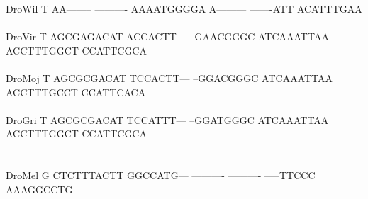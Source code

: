 \documentclass[11pt,twoside,reqno,a4paper]{article}
\begin{document}
{DroWil	T	AA--------	----------	AAAATGGGGA	A---------	-------ATT	ACATTTGAA\\
\hspace*{7\charwidth}\hspace*{1\charwidth}\hspace*{1\charwidth}\hspace*{1\charwidth}\hspace*{1\charwidth}\hspace*{1\charwidth}\hspace*{1\charwidth}\\
DroVir	T	AGCGAGACAT	ACCACTT---	--GAACGGGC	ATCAAATTAA	ACCTTTGGCT	CCATTCGCA\\
\hspace*{7\charwidth}\hspace*{1\charwidth}\hspace*{1\charwidth}\hspace*{1\charwidth}\hspace*{1\charwidth}\hspace*{1\charwidth}\hspace*{1\charwidth}\\
DroMoj	T	AGCGCGACAT	TCCACTT---	--GGACGGGC	ATCAAATTAA	ACCTTTGCCT	CCATTCACA\\
\hspace*{7\charwidth}\hspace*{1\charwidth}\hspace*{1\charwidth}\hspace*{1\charwidth}\hspace*{1\charwidth}\hspace*{1\charwidth}\hspace*{1\charwidth}\\
DroGri	T	AGCGCGACAT	TCCATTT---	--GGATGGGC	ATCAAATTAA	ACCTTTGGCT	CCATTCGCA\\
\hspace*{7\charwidth}\hspace*{1\charwidth}\hspace*{1\charwidth}\hspace*{1\charwidth}\hspace*{1\charwidth}\hspace*{1\charwidth}\hspace*{1\charwidth}\\
\\
DroMel	G	CTCTTTACTT	GGCCATG---	----------	----------	-----TTCCC	AAAGGCCTG\\
\hspace*{7\charwidth}\hspace*{1\charwidth}\hspace*{1\charwidth}\hspace*{1\charwidth}\hspace*{1\charwidth}\hspace*{1\charwidth}\hspace*{1\charwidth}\\
}
\end{document}
